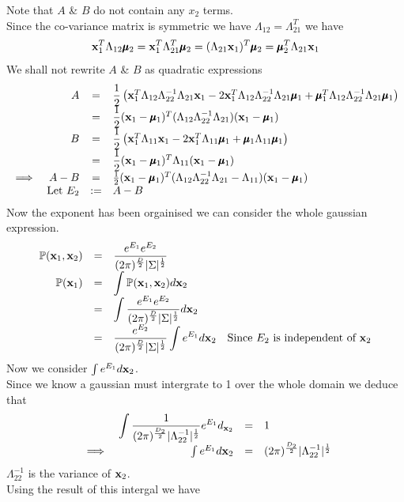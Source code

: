 \documentclass[11pt,a4paper]{article}
\begin{document}
Note that $A$ \& $B$ do not contain any $x_2$ terms.\\
Since the co-variance matrix is symmetric we have $\Lambda_{12}=\Lambda_{21}^T$ we have
$$\textbf{x}_1^T\Lambda_{12}\pmb{\mu}_2=\textbf{x}_1^T\Lambda_{21}^T\pmb{\mu}_2=(\Lambda_{21}\textbf{x}_1)^T\pmb{\mu}_2=\pmb{\mu}_2^T\Lambda_{21}\textbf{x}_1$$
We shall not rewrite $A$ \& $B$ as quadratic expressions
\[\begin{array}{rrcl}
&A&=&\dfrac{1}{2}\left(\textbf{x}_1^T\Lambda_{12}\Lambda_{22}^{-1}\Lambda_{21}\textbf{x}_1-2\textbf{x}_1^T\Lambda_{12}\Lambda_{22}^{-1}\Lambda_{21}\pmb{\mu}_1+\pmb{\mu}_1^T\Lambda_{12}\Lambda_{22}^{-1}\Lambda_{21}\pmb{\mu}_1\right)\\
&&=&\dfrac{1}{2}(\textbf{x}_1-\pmb{\mu}_1)^T(\Lambda_{12}\Lambda_{22}^{-1}\Lambda_{21})(\textbf{x}_1-\pmb{\mu}_1)\\
&B&=&\dfrac{1}{2}\left(\textbf{x}_1^T\Lambda_{11}\textbf{x}_1-2\textbf{x}_1^T\Lambda_{11}\pmb{\mu}_1+\pmb{\mu}_{1}\Lambda_{11}\pmb{\mu}_1\right)\\
&&=&\dfrac{1}{2}(\textbf{x}_1-\pmb{\mu}_1)^T\Lambda_{11}(\textbf{x}_1-\pmb{\mu}_1)\\
\implies&A-B&=&\frac{1}{2}(\textbf{x}_1-\pmb{\mu}_1)^T(\Lambda_{12}\Lambda_{22}^{-1}\Lambda_{21}-\Lambda_{11})(\textbf{x}_1-\pmb{\mu}_1)\\
&\mathrm{Let\ }E_2&:=&A-B
\end{array}\]
Now the exponent has been orgainised we can consider the whole gaussian expression.
\[\begin{array}{rcll}
\mathbb{P}(\textbf{x}_1,\textbf{x}_2)&=&\dfrac{e^{E_1}e^{E_2}}{(2\pi)^{\frac{D}{2}}|\Sigma|^{\frac{1}{2}}}\\
\mathbb{P}(\textbf{x}_1)&=&{\displaystyle\int\mathbb{P}(\textbf{x}_1,\textbf{x}_2)d\textbf{x}_2}\\
&=&{\displaystyle\int\dfrac{e^{E_1}e^{E_2}}{(2\pi)^{\frac{D}{2}}|\Sigma|^{\frac{1}{2}}}d\textbf{x}_2}\\
&=&{\dfrac{e^{E_2}}{(2\pi)^{\frac{D}{2}}|\Sigma|^{\frac{1}{2}}}\displaystyle\int e^{E_1}d\textbf{x}_2}&\text{Since $E_2$ is independent of $\textbf{x}_2$}
\end{array}\]
Now we consider $\int e^{E_1}d\textbf{x}_2$.\\
Since we know a gaussian must intergrate to 1 over the whole domain we deduce that
\[\begin{array}{rrcl}
&{\displaystyle\int\dfrac{1}{(2\pi)^{\frac{D_2}{2}}|\Lambda_{22}^{-1}|^{\frac{1}{2}}}e^{E_1}d_{\textbf{x}_2}}&=&1\\\
\implies&\int e^{E_1}d\textbf{x}_2&=&(2\pi)^{\frac{D_2}{2}}|\Lambda_{22}^{-1}|^{\frac{1}{2}}
\end{array}\]
\nb $\Lambda_{22}^{-1}$ is the variance of $\textbf{x}_2$.\\
Using the result of this intergal we have
\end{document}
